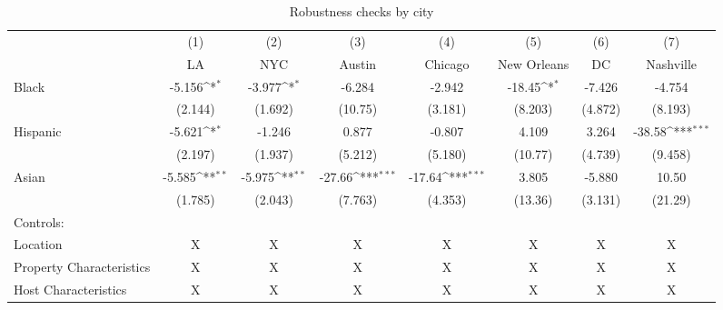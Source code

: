 {
\def\sym#1{\ifmmode^{#1}\else\(^{#1}\)\fi}
\begin{longtable}{l*{7}{c}}
\caption{Robustness checks by city} \label{table:robustcity}\\
\hline\hline\endfirsthead\hline\endhead\hline\endfoot\endlastfoot
                    &\multicolumn{1}{c}{(1)}&\multicolumn{1}{c}{(2)}&\multicolumn{1}{c}{(3)}&\multicolumn{1}{c}{(4)}&\multicolumn{1}{c}{(5)}&\multicolumn{1}{c}{(6)}&\multicolumn{1}{c}{(7)}\\
                    &\multicolumn{1}{c}{LA}&\multicolumn{1}{c}{NYC}&\multicolumn{1}{c}{Austin}&\multicolumn{1}{c}{Chicago}&\multicolumn{1}{c}{New Orleans}&\multicolumn{1}{c}{DC}&\multicolumn{1}{c}{Nashville}\\
\hline
Black               &      -5.156\sym{*}  &      -3.977\sym{*}  &      -6.284         &      -2.942         &      -18.45\sym{*}  &      -7.426         &      -4.754         \\
                    &     (2.144)         &     (1.692)         &     (10.75)         &     (3.181)         &     (8.203)         &     (4.872)         &     (8.193)         \\
[1em]
Hispanic            &      -5.621\sym{*}  &      -1.246         &       0.877         &      -0.807         &       4.109         &       3.264         &      -38.58\sym{***}\\
                    &     (2.197)         &     (1.937)         &     (5.212)         &     (5.180)         &     (10.77)         &     (4.739)         &     (9.458)         \\
[1em]
Asian               &      -5.585\sym{**} &      -5.975\sym{**} &      -27.66\sym{***}&      -17.64\sym{***}&       3.805         &      -5.880         &       10.50         \\
                    &     (1.785)         &     (2.043)         &     (7.763)         &     (4.353)         &     (13.36)         &     (3.131)         &     (21.29)         \\
\hline
Controls:        \\
\hspace{3mm} Location  &                           X      & X & X & X & X & X &  X\\
\hspace{3mm} Property Characteristics  &   X  & X & X & X & X & X &  X\\
\hspace{3mm} Host Characteristics  &         X& X & X & X & X & X &  X\\

\end{longtable}}
